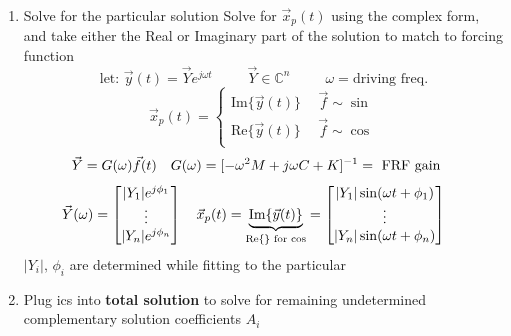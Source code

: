 \documentclass[twocolumn, 12pt]{article}    %
\begin{document}
\begin{enumerate}
    \item  Solve for the particular solution
    Solve for \(\vec{x}_p(t)\) using the complex form, and take either the Real or Imaginary part of the solution to match to forcing function
    \begin{equation*}
        \text{let: } \vec{y}(t) = \vec{Y} e^{j\omega t} \hspace{30pt} \vec{Y} \in \mathds{C}^n \hspace{30pt} \omega = \text{driving freq.}
    \end{equation*}
    \begin{equation*}
        \vec{x}_p(t) = \begin{cases}
            \text{Im}\{\vec{y}(t)\} \hspace{15pt} \vec{f} \sim \sin\\
            \text{Re}\{\vec{y}(t)\} \hspace{15pt} \vec{f} \sim \cos\\
        \end{cases}
    \end{equation*}
    \begin{equation*}
        \hspace{-10pt}\vec{Y} = G(\omega) \vec{f}(t) \hspace{10pt}    G(\omega) = [-\omega^2M + j\omega C + K]^{-1} =\text{ FRF gain}
    \end{equation*}
    \begin{equation*}
        \hspace{-15pt} \vec{Y}(\omega) = \begin{bmatrix}
            |Y_1| e^{j \phi_1} \\ \vdots \\ |Y_n| e^{j \phi_n}
        \end{bmatrix} \hspace{10pt}
        \vec{x}_p(t) = \underbrace{\text{Im}\{ \vec{y}(t)\}}_{\text{Re\{\} for cos}} = \begin{bmatrix}
            |Y_1| \sin (\omega t + \phi_1) \\ \vdots \\ |Y_n| \sin (\omega t + \phi_n)
        \end{bmatrix}
    \end{equation*}
    \(|Y_i|,\, \phi_i\) are determined while fitting to the particular

    \item Plug ics into \textbf{total solution} to solve for remaining undetermined complementary solution coefficients \(A_i\)
\end{enumerate}
\end{document}
